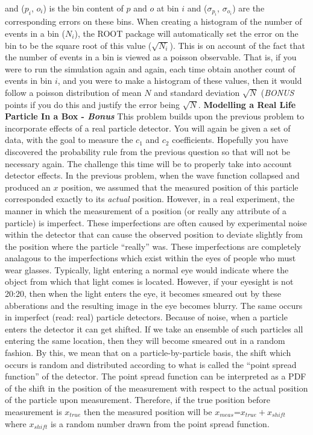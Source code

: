 \documentclass[12pt]{article}
\begin{document}
and ($p_{i}$, $o_{i}$) is the bin content of $p$ and $o$ at bin $i$ and ($\sigma_{p_{i}}$, $\sigma_{o_{i}}$) are the corresponding errors on these bins.  When creating a histogram of the number of events in a bin ($N_{i}$), the ROOT package will automatically set the error on the bin to be the square root of this value ($\sqrt{N_{i}}$).  This is on account of the fact that the number of events in a bin is viewed as a poisson observable.  That is, if you were to run the simulation again and again, each time obtain another count of events in bin $i$, and you were to make a histogram of these values, then it would follow a poisson distribution of mean $N$ and standard deviation $\sqrt{N}$ (\textit{BONUS} points if you do this and justify the error being $\sqrt{N}$. 
\newline
\newline
\textbf{Modelling a \textbf{Real Life} Particle In a Box - \textit{Bonus}} 
\newline
This problem builds upon the previous problem to incorporate effects of a real particle detector.  You will again be given a set of data, with the goal to measure the $c_1$ and $c_2$ coefficients.  Hopefully you have discovered the probability rule from the previous question so that will not be necessary again.  The challenge this time will be to properly take into account detector effects.
\newline
\newline
In the previous problem, when the wave function collapsed and produced an $x$ position, we assumed that the measured position of this particle corresponded exactly to its \textit{actual} position.  However, in a real experiment, the manner in which the measurement of a position (or really any attribute of a particle) is imperfect.  These imperfections are often caused by experimental noise within the detector that can cause the observed position to deviate slightly from the position where the particle ``really'' was.  These imperfections are completely analagous to the imperfections which exist within the eyes of people who must wear glasses.  Typically, light entering a normal eye would indicate where the object from which that light comes is located.  However, if your eyesight is not 20:20, then when the light enters the eye, it becomes smeared out by these abberations and the resulting image in the eye becomes blurry.  The same occurs in imperfect (read: real) particle detectors.  Because of noise, when a particle enters the detector it can get shifted.  If we take an ensemble of such particles all entering the same location, then they will become smeared out in a random fashion.  By this, we mean that on a particle-by-particle basis, the shift which occurs is random and distributed according to what is called the ``point spread function'' of the detector.    The point spread function can be interpreted as a PDF of the shift in the position of the measurement with respect to the actual position of the particle upon measurement.  Therefore, if the true position before measurement is $x_{true}$ then the measured position will be $x_{meas}$=$x_{true}+x_{shift}$ where $x_{shift}$ is a random number drawn from the point spread function.
\end{document}
